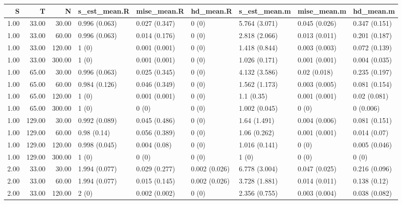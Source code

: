 \begin{table}[ht]
\centering
\begin{tabular}{rrrllllll}
  \hline
S & T & N & s\_est\_mean.R & mise\_mean.R & hd\_mean.R & s\_est\_mean.m & mise\_mean.m & hd\_mean.m \\ 
  \hline
1.00 & 33.00 & 30.00 & 0.996 (0.063) & 0.027 (0.347) & 0 (0) & 5.764 (3.071) & 0.045 (0.026) & 0.347 (0.151) \\ 
  1.00 & 33.00 & 60.00 & 0.996 (0.063) & 0.014 (0.176) & 0 (0) & 2.818 (2.066) & 0.013 (0.011) & 0.201 (0.187) \\ 
  1.00 & 33.00 & 120.00 & 1 (0) & 0.001 (0.001) & 0 (0) & 1.418 (0.844) & 0.003 (0.003) & 0.072 (0.139) \\ 
  1.00 & 33.00 & 300.00 & 1 (0) & 0.001 (0.001) & 0 (0) & 1.026 (0.171) & 0.001 (0.001) & 0.004 (0.035) \\ 
  1.00 & 65.00 & 30.00 & 0.996 (0.063) & 0.025 (0.345) & 0 (0) & 4.132 (3.586) & 0.02 (0.018) & 0.235 (0.197) \\ 
  1.00 & 65.00 & 60.00 & 0.984 (0.126) & 0.046 (0.349) & 0 (0) & 1.562 (1.173) & 0.003 (0.005) & 0.081 (0.154) \\ 
  1.00 & 65.00 & 120.00 & 1 (0) & 0.001 (0.001) & 0 (0) & 1.1 (0.35) & 0.001 (0.001) & 0.02 (0.081) \\ 
  1.00 & 65.00 & 300.00 & 1 (0) & 0 (0) & 0 (0) & 1.002 (0.045) & 0 (0) & 0 (0.006) \\ 
  1.00 & 129.00 & 30.00 & 0.992 (0.089) & 0.045 (0.486) & 0 (0) & 1.64 (1.491) & 0.004 (0.006) & 0.081 (0.151) \\ 
  1.00 & 129.00 & 60.00 & 0.98 (0.14) & 0.056 (0.389) & 0 (0) & 1.06 (0.262) & 0.001 (0.001) & 0.014 (0.07) \\ 
  1.00 & 129.00 & 120.00 & 0.998 (0.045) & 0.004 (0.08) & 0 (0) & 1.016 (0.141) & 0 (0) & 0.005 (0.046) \\ 
  1.00 & 129.00 & 300.00 & 1 (0) & 0 (0) & 0 (0) & 1 (0) & 0 (0) & 0 (0) \\ 
  2.00 & 33.00 & 30.00 & 1.994 (0.077) & 0.029 (0.277) & 0.002 (0.026) & 6.778 (3.004) & 0.047 (0.025) & 0.216 (0.096) \\ 
  2.00 & 33.00 & 60.00 & 1.994 (0.077) & 0.015 (0.145) & 0.002 (0.026) & 3.728 (1.881) & 0.014 (0.011) & 0.138 (0.12) \\ 
  2.00 & 33.00 & 120.00 & 2 (0) & 0.002 (0.002) & 0 (0) & 2.356 (0.755) & 0.003 (0.004) & 0.038 (0.082) \\ 

\end{tabular}
\end{table}
